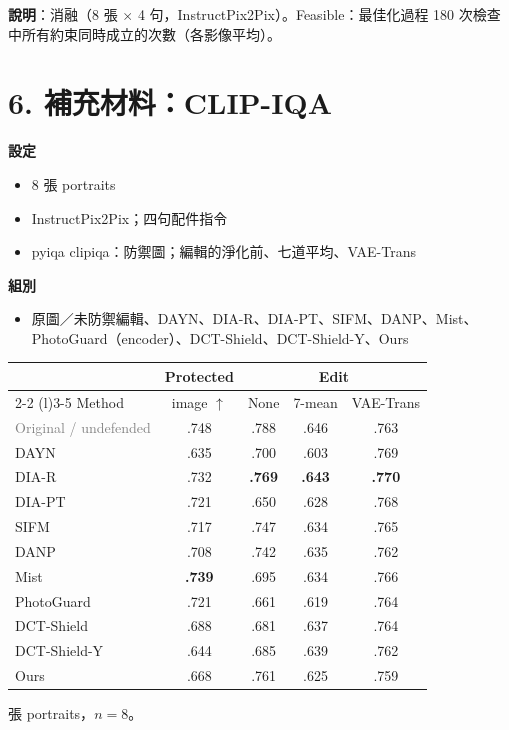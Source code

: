 \documentclass[10pt]{article}
\newcommand{\pend}[1]{#1}
\begin{document}
\textbf{說明}：消融（8 張 $\times$ 4 句，InstructPix2Pix）。Feasible：最佳化過程 180 次檢查中所有約束同時成立的次數（各影像平均）。

\clearpage
\section*{6. 補充材料：CLIP-IQA}
\textbf{設定}
\begin{itemize}
  \item 8 張 portraits
  \item InstructPix2Pix；四句配件指令
  \item pyiqa clipiqa：防禦圖；編輯的淨化前、七道平均、VAE-Trans
\end{itemize}
\textbf{組別}
\begin{itemize}
  \item 原圖／未防禦編輯、DAYN、DIA-R、DIA-PT、SIFM、DANP、Mist、PhotoGuard（encoder）、DCT-Shield、DCT-Shield-Y、Ours
\end{itemize}

\begin{table}[h]
  \centering
  \footnotesize
  \setlength{\tabcolsep}{5pt}
  \begin{tabular}{lcccc}
    \toprule
    & Protected & \multicolumn{3}{c}{Edit} \\
    \cmidrule(lr){2-2} \cmidrule(l){3-5}
    Method & image $\uparrow$ & None & 7-mean & VAE-Trans \\
    \midrule
    \textcolor{gray}{Original / undefended} & \pend{.748} & \pend{.788} & \pend{.646} & \pend{.763} \\
    \midrule
    DAYN & \pend{.635} & \pend{.700} & \pend{.603} & \pend{.769} \\
    DIA-R & \pend{.732} & \pend{\textbf{.769}} & \pend{\textbf{.643}} & \pend{\textbf{.770}} \\
    DIA-PT & \pend{.721} & \pend{.650} & \pend{.628} & \pend{.768} \\
    SIFM & \pend{.717} & \pend{.747} & \pend{.634} & \pend{.765} \\
    DANP & \pend{.708} & \pend{.742} & \pend{.635} & \pend{.762} \\
    Mist & \pend{\textbf{.739}} & \pend{.695} & \pend{.634} & \pend{.766} \\
    PhotoGuard & \pend{.721} & \pend{.661} & \pend{.619} & \pend{.764} \\
    DCT-Shield & \pend{.688} & \pend{.681} & \pend{.637} & \pend{.764} \\
    DCT-Shield-Y & \pend{.644} & \pend{.685} & \pend{.639} & \pend{.762} \\
    \midrule
    \rowcolor{oursrow}
    Ours & \pend{.668} & \pend{.761} & \pend{.625} & \pend{.759} \\
    \bottomrule
  \end{tabular}

   張 portraits，$n=8$。
\end{table}
\end{document}
